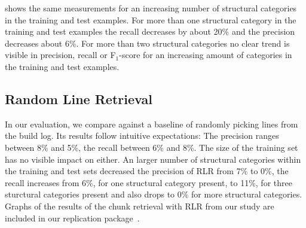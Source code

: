  shows the same
measurements for an increasing number of structural categories in the
training and test examples.
For more than one structural category in
the training and test examples the recall decreases by about 20\% and
the precision decreases about 6\%.
For more than two structural
categories no clear trend is visible in precision, recall or
F$_{1}$-score for an increasing amount of categories in the training
and test examples.

\subsection{Random Line Retrieval}
\label{sec:r:rlr}

In our evaluation, we compare against a baseline of randomly
picking lines from the build log.
Its results follow intuitive
expectations:
The precision ranges between 8\% and 5\%, the recall between 6\% and
8\%.
The size of the training set has no visible impact on either.
An larger number of structural categories within the training and
test sets decreased the precision of RLR from 7\% to 0\%, the recall
increases from 6\%, for one structural category present, to 11\%, for
three sturctural categories present and also drops to 0\% for more
structural categories.
Graphs of the results of the chunk retrieval with RLR from our study
are included in our replication
package~\cite{brandt2020chunk-replication}.

